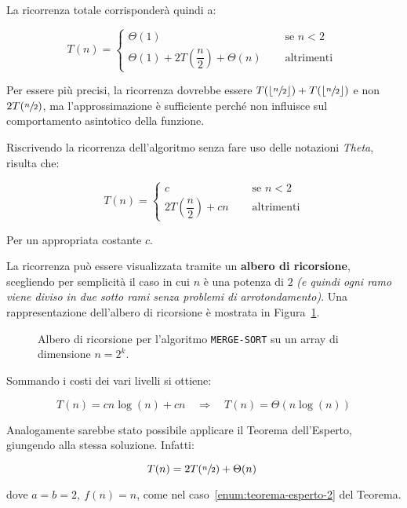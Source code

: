 \documentclass[italian, 10pt]{article}
\begin{document}
La ricorrenza totale corrisponderà quindi a:

\[T(n) = \begin{cases}
    \Theta(1)                                           & \quad \text{ se } n < 2   \\
    \Theta(1) + 2T\left(\dfrac{n}{2}\right) + \Theta(n) & \quad \text{ altrimenti }
  \end{cases}\]

Per essere più precisi, la ricorrenza dovrebbe essere \(T(\lfloor \sfrac{n}{2} \rfloor) + T(\lfloor \sfrac{n}{2} \rfloor)\) e non \(2T(\sfrac{n}{2})\), ma l'approssimazione è sufficiente perché non influisce sul comportamento asintotico della funzione.

\bigskip

Riscrivendo la ricorrenza dell'algoritmo senza fare uso delle notazioni \textit{Theta}, risulta che:

\[
  T(n) = \begin{cases}
    c                                & \quad \text{ se } n < 2  \\
    2T\left(\dfrac{n}{2}\right) + cn & \quad \text{ altrimenti}
  \end{cases}
\]

Per un appropriata costante \(c\).

La ricorrenza può essere visualizzata tramite un \textbf{albero di ricorsione}, scegliendo per semplicità il caso in cui \(n\) è una potenza di \(2\) \textit{(e quindi ogni ramo viene diviso in due sotto rami senza problemi di arrotondamento)}.
Una rappresentazione dell'albero di ricorsione è mostrata in Figura~\ref{fig:albero-ricorsione-algoritmo-merge-sort}.

\begin{figure}[htbp]
  \bigskip
  \centering
  \caption{Albero di ricorsione per l'algoritmo \texttt{MERGE-SORT} su un array di dimensione \(n = 2^k\).}
  \label{fig:albero-ricorsione-algoritmo-merge-sort}
  \bigskip
\end{figure}

Sommando i costi dei vari livelli si ottiene:

\[ T(n) = cn \log{(n)} + cn \quad \Rightarrow \quad T(n) = \Theta(n \log{(n)}) \]

\bigskip
Analogamente sarebbe stato possibile applicare il Teorema dell'Esperto, giungendo alla stessa soluzione.
Infatti:

\[ T(n) = 2T(\sfrac{n}{2}) + \Theta(n)\ \]

dove \(a = b = 2,\ f(n) = n\), come nel caso~\ref{enum:teorema-esperto-2} del Teorema.
\end{document}
